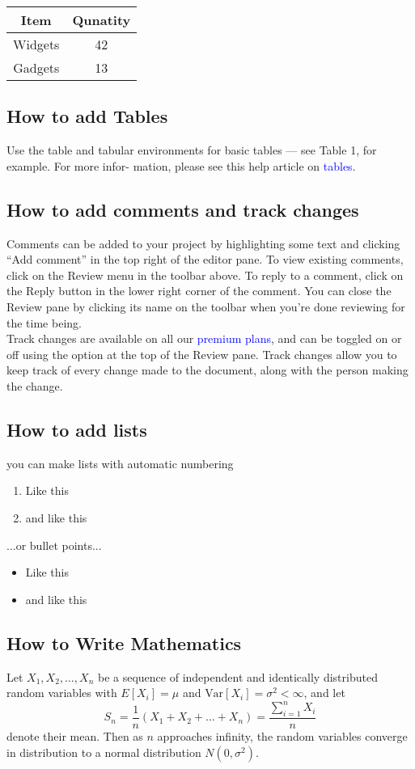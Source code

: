 \documentclass{article}
\begin{document}
\begin{tabular}{c|c}
	Item & Qunatity \\\hline
	Widgets & 42 \\
	Gadgets & 13 
\end{tabular}

\subsection{How to add Tables}
Use the table and tabular environments for basic tables — see Table 1, for example. For more infor-
mation, please see this help article on \textcolor{blue}{tables}.

\subsection{How to add comments and track changes}
Comments can be added to your project by highlighting some text and clicking “Add comment” in
the top right of the editor pane. To view existing comments, click on the Review menu in the toolbar
above. To reply to a comment, click on the Reply button in the lower right corner of the comment.
You can close the Review pane by clicking its name on the toolbar when you’re done reviewing for the
time being.\\

Track changes are available on all our \textcolor{blue}{premium plans}, and can be toggled on or off using the option
at the top of the Review pane. Track changes allow you to keep track of every change made to the
document, along with the person making the change.

\subsection{How to add lists}
you can make lists with automatic numbering


\begin{enumerate}
\item Like this
\item and like this
\end{enumerate}
...or bullet points...
\begin{itemize}
	\item Like this
	\item and like this
\end{itemize}



\subsection{How to Write Mathematics}
	Let $X_1, X_2, \ldots, X_n$ be a sequence of independent and identically distributed random variables with $E[X_i] = \mu$ and $\text{Var}[X_i] = \sigma^2 < \infty$, and let
	\[
	S_n = \frac{1}{n}(X_1 + X_2 + \ldots + X_n) = \frac{\sum_{i=1}^n X_i}{n}
	\]
	denote their mean. Then as $n$ approaches infinity, the random variables converge in distribution to a normal distribution $N(0, \sigma^2)$.
	
\end{document}

